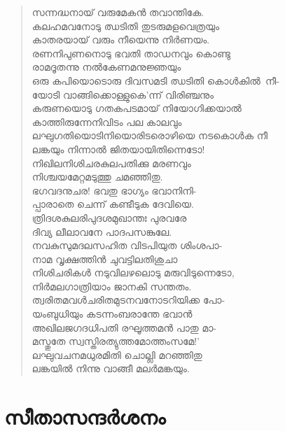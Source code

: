 \begin{verse}
സന്നദ്ധനായ് വരുമേകന്‍ തവാന്തികേ.\\
കലഹമവനോടു ഝടിതി തുടരുമളവെത്രയും\\
കാതരയായ് വരും നീയെന്നു നിര്‍ണയം.\\
രണനിപുണനൊടു ഭവതി താഡനവും കൊണ്ടു\\
രാമദൂതന്നു നല്‍കേണമനുജ്ഞയും\\
ഒരു കപിയൊടൊരു ദിവസമടി ഝടിതി \hbox{കൊള്‍കില്‍ നീ-}\\
യോടി വാങ്ങിക്കൊള്ളുകെ’ന്ന് വിരിഞ്ചനും\\
കരുണയൊടു ഗതകപടമായ് നിയോഗിക്കയാല്‍\\
കാത്തിരുന്നേനിവിടം പല കാലവും\\
ലഘുഗതിയൊടിനിയൊരിടരൊഴിയെ നടകൊള്‍ക നീ\\
ലങ്കയും നിന്നാല്‍ ജിതയായിതിന്നെടോ!\\
നിഖിലനിശിചരകുലപതിക്കു മരണവും\\
നിശ്ചയമേറ്റമടുത്തു ചമഞ്ഞിതു.\\
ഭഗവദനുചര! ഭവതു ഭാഗ്യം ഭവാനിനി-\\
പ്പാരാതെ ചെന്ന് കണ്ടീടുക ദേവിയെ.\\
ത്രിദശകുലരിപുദശമുഖാന്തഃ പുരവരേ\\
ദിവ്യ ലീലാവനേ പാദപസങ്കുലേ.\\
നവകുസുമദലസഹിത വിടപിയുത ശിംശപാ-\\
നാമ വൃക്ഷത്തിന്‍ ചുവട്ടിലതിശുചാ\\
നിശിചരികള്‍ നടുവിലഴലൊടു മരുവിടുന്നെടോ,\\
നിര്‍മലഗാത്രിയാം ജാനകി സന്തതം.\\
ത്വരിതമവള്‍ചരിതമുടനവനോടറിയിക്ക പോ-\\
യംബുധിയും കടന്നംബരാന്തേ ഭവാന്‍\\
അഖിലജഗദധിപതി രഘൂത്തമന്‍ പാതു മാ-\\
മസ്തുതേ സ്വസ്തിരത്യുത്തമോത്തംസമേ!’\\
ലഘുവചനമധുരമിതി ചൊല്ലി മറഞ്ഞിതു\\
ലങ്കയില്‍ നിന്നു വാങ്ങീ മലര്‍മങ്കയും.
\end{verse}


\section{സീതാസന്ദര്‍ശനം}

